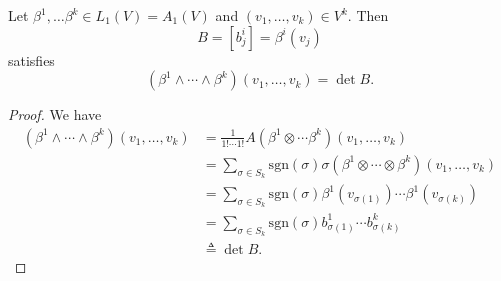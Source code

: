 \begin{lemma}
Let $\beta^1, \dots \beta^k \in L_1(V) = A_1(V)$ and
$(v_1, \dots, v_k) \in V^k$. Then
$$
B = [b_j^i] = \beta^i(v_j)
$$
satisfies
$$
  (\beta^1 \wedge \cdots \wedge \beta^k)(v_1, \dots, v_k)
= \det B.
$$
\end{lemma}
\begin{proof}
We have
\begin{align*}
   (\beta^1 \wedge \cdots \wedge \beta^k)(v_1, \dots, v_k)
&= \frac{1}{1! \cdots 1!}
   A(\beta^1 \otimes \cdots \beta^k)(v_1, \dots, v_k) \\
&= \sum_{\sigma \in S_k}
     \mathrm{sgn}(\sigma)
     \sigma(\beta^1 \otimes \cdots \otimes \beta^k)
       (v_1, \dots, v_k) \\
&= \sum_{\sigma \in S_k}
     \mathrm{sgn}(\sigma)
     \beta^1(v_{\sigma(1)}) \cdots \beta^1(v_{\sigma(k)}) \\
&= \sum_{\sigma \in S_k}
     \mathrm{sgn}(\sigma)
     b^1_{\sigma(1)} \cdots b^k_{\sigma(k)} \\
&\triangleq \det B.
\end{align*}
\end{proof}
